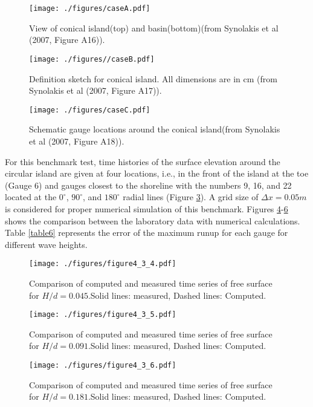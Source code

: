 \documentclass[11pt]{article}
\begin{document}
\begin{figure}[htbp]
\centering
\texttt{[image: ./figures/caseA.pdf]}
\caption{View of conical island(top) and basin(bottom)(from Synolakis et al (2007, Figure A16)).}
\label{figure4.3.1}
\end{figure}

\begin{figure}[htbp]
\centering
\texttt{[image: ./figures//caseB.pdf]}
\caption{Definition sketch for conical island. All dimensions are in cm (from Synolakis et al (2007, Figure A17)).}
\label{figure4.3.2}
\end{figure}

\begin{figure}[htbp]
\centering
\texttt{[image: ./figures/caseC.pdf]}
\caption{Schematic gauge locations around the conical island(from Synolakis et al (2007, Figure A18)).}
\label{figure4.3.3}
\end{figure}

For this benchmark test, time histories of the surface elevation around the circular island are given at four locations, i.e., in the front of the island at the toe (Gauge 6) and gauges closest to the shoreline with the numbers 9, 16, and 22 located at the $0^\circ$, $90^\circ$, and $180^\circ$ radial lines (Figure {\ref{figure4.3.3}}). A grid size of $\Delta x=0.05m$ is considered for proper numerical simulation of this benchmark. Figures {\ref{figure4.3.4}}-{\ref{figure4.3.6}} shows the comparison between the laboratory data with numerical calculations. Table {\ref{table6}} represents the error of the maximum runup for each gauge for different wave heights.

\begin{figure}[t]
\centering
\texttt{[image: ./figures/figure4\_3\_4.pdf]}
\caption{Comparison of computed and measured time series of free surface for $H/d=0.045$.Solid lines: measured, Dashed lines: Computed.}
\label{figure4.3.4}
\end{figure}

\begin{figure}[htbp]
\centering
\texttt{[image: ./figures/figure4\_3\_5.pdf]}
\caption{Comparison of computed and measured time series of free surface for $H/d=0.091$.Solid lines: measured, Dashed lines: Computed.}
\label{figure4.3.5}
\end{figure}

\begin{figure}[htbp]
\centering
\texttt{[image: ./figures/figure4\_3\_6.pdf]}
\caption{Comparison of computed and measured time series of free surface for $H/d=0.181$.Solid lines: measured, Dashed lines: Computed.}
\label{figure4.3.6}
\end{figure}
\end{document}
